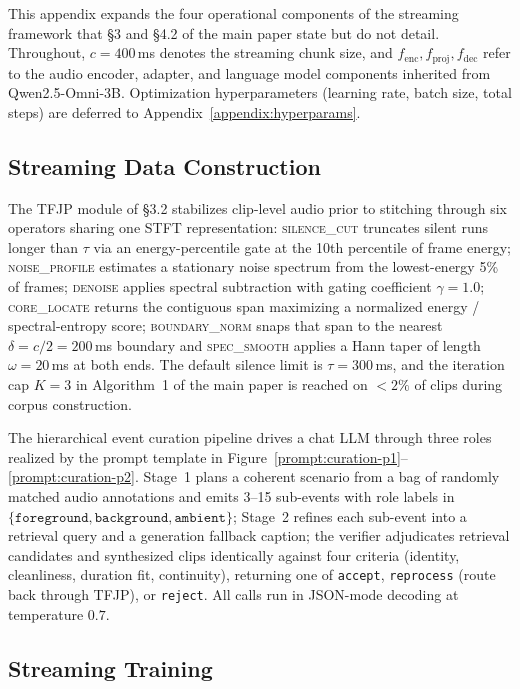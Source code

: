 \documentclass{article}
\begin{document}
This appendix expands the four operational components of the streaming
framework that \S3 and \S4.2 of the main paper state but do not detail.
Throughout, $c=400$\,ms denotes the streaming chunk size, and
$f_{\text{enc}}, f_{\text{proj}}, f_{\text{dec}}$ refer to the audio
encoder, adapter, and language model components inherited from
Qwen2.5-Omni-3B. Optimization hyperparameters (learning rate, batch size,
total steps) are deferred to Appendix~\ref{appendix:hyperparams}.

\subsection{Streaming Data Construction}
\label{appendix:data-construction}

The TFJP module of \S3.2 stabilizes clip-level audio prior to stitching
through six operators sharing one STFT representation: 
\textsc{silence\_cut} truncates silent runs longer than $\tau$ via an
energy-percentile gate at the 10th percentile of frame energy;
\textsc{noise\_profile} estimates a stationary noise spectrum from the
lowest-energy 5\% of frames; \textsc{denoise} applies spectral subtraction
with gating coefficient $\gamma=1.0$; \textsc{core\_locate} returns the
contiguous span maximizing a normalized energy / spectral-entropy score;
\textsc{boundary\_norm} snaps that span to the nearest
$\delta=c/2=200$\,ms boundary and \textsc{spec\_smooth} applies a Hann
taper of length $\omega=20$\,ms at both ends. The default silence limit
is $\tau=300$\,ms, and the iteration cap $K=3$ in Algorithm~1 of the main
paper is reached on $<2\%$ of clips during corpus construction.

The hierarchical event curation pipeline drives a chat LLM through three
roles realized by the prompt template in
Figure~\ref{prompt:curation-p1}--\ref{prompt:curation-p2}. Stage~1 plans
a coherent scenario from a bag of randomly matched audio annotations and
emits 3--15 sub-events with role labels in
$\{\texttt{foreground}, \texttt{background}, \texttt{ambient}\}$;
Stage~2 refines each sub-event into a retrieval query and a generation
fallback caption; the verifier adjudicates retrieval candidates and
synthesized clips identically against four criteria (identity,
cleanliness, duration fit, continuity), returning one of \texttt{accept},
\texttt{reprocess} (route back through TFJP), or \texttt{reject}. All
calls run in JSON-mode decoding at temperature $0.7$.

\subsection{Streaming Training}
\label{appendix:streaming-training}
\end{document}
